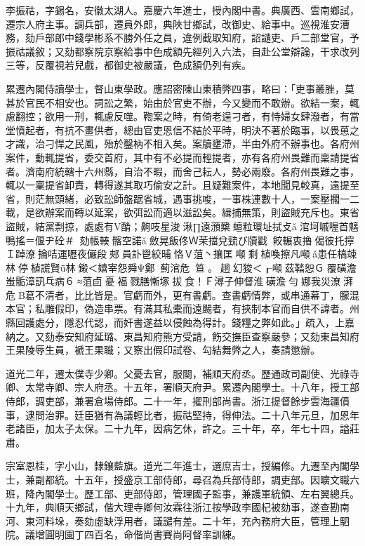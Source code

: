 \begin{pinyinscope}
李振祜，字錫名，安徽太湖人。嘉慶六年進士，授內閣中書。典廣西、雲南鄉試，遷宗人府主事。調兵部，遷員外郎，典陜甘鄉試，改御史、給事中。巡視淮安漕務，劾戶部郎中錢學彬系不勝外任之員，違例截取知府，詔譴吏、戶二部堂官，予振祜議敘；又劾都察院京察給事中色成額先經列入六法，自赴公堂辯論，干求改列三等，反覆視若兒戲，都御史被嚴議，色成額仍列有疾。

累遷內閣侍讀學士，督山東學政。應詔密陳山東積弊四事，略曰：「吏事叢脞，莫甚於官民不相安也。詞訟之繁，始由於官吏不辦，今又變而不敢辦。欲結一案，輒慮翻控；欲用一刑，輒慮反噬。鞫案之時，有倚老逞刁者，有恃婦女肆潑者，有當堂憤起者，有抗不畫供者，總由官吏恩信不結於平時，明決不著於臨事，以畏葸之才識，治刁悍之民風，殆於鑿枘不相入矣。案牘壅滯，半由外府不辦事也。各府州案件，動輒提省，委交首府，其中有不必提而輕提者，亦有各府州畏難而稟請提省者。濟南府統轄十六州縣，自治不暇，而舍己耘人，勢必兩廢。各府州畏難之事，輒以一稟提省卸責，轉得遂其取巧偷安之計。且疑難案件，本地聞見較真，遠提至省，則茫無頭緒，必致訟師盤踞省城，遇事挑唆，一事株連數十人，一案壓擱一二載，是欲辦案而轉以延案，欲弭訟而適以滋訟矣。緝捕無策，則盜賊充斥也。東省盜賊，結黨剽掠，處處有V酳；齁吱星浚湫∏遠澦櫫蟺粒環址拭⽁ǎ涫坷嘁喔首魑鴨搖＝偃ヂ砼＃劾帳輳髂空諾ǎ斂晃飯佟Ｗ茉擋兌巰び牘戳餃輾衷擼偈彼托擰Ｉ踔潦掄咭運嚦夜儼段郟員訃鬯絞晡恪Ｖ菹⼂攘匡噸剩植喚擦凡噸ǎ患任槁竦林停植謊賢ǖ林鎩＜嬉宰怨舜Ψ鄭薊涫危笪。趟幻狻＜┎噸茲鞜恕Ｇ覆磺澹蚩骺漳訊乓病６≈菹卣憂福戮膳慚塚拔食！Ｆ潯子伸督淮磺澹勻娜我災潦湃危B葛不清者，比比皆是。官虧而外，更有書虧。查書虧情弊，或串通幕丁，朦混本官；私雕假印，偽造串票。有滿其私橐而遠颺者，有挾制本官而自供不諱者。州縣回護處分，隱忍代認，而奸書遂益以侵蝕為得計。錢糧之弊如此。」疏入，上嘉納之。又劾泰安知府延璐、東昌知府熊方受請，飭交撫臣查察嚴參；又劾東昌知府王果陵辱生員，褫王果職；又察出假印試卷、勾結舞弊之人，奏請懲辦。

道光二年，遷太僕寺少卿。父憂去官，服闋，補順天府丞。歷通政司副使、光祿寺卿、太常寺卿、宗人府丞。十五年，署順天府尹。累遷內閣學士。十八年，授工部侍郎，調吏部，兼署倉場侍郎。二十一年，擢刑部尚書。浙江提督餘步雲海疆僨事，逮問治罪。廷臣猶有為議輕比者，振祜堅持，得伸法。二十八年元旦，加恩年老諸臣，加太子太保。二十九年，因病乞休，許之。三十年，卒，年七十四，謚莊肅。

宗室恩桂，字小山，隸鑲藍旗。道光二年進士，選庶吉士，授編修。九遷至內閣學士，兼副都統。十五年，授盛京工部侍郎，尋召為兵部侍郎，調吏部。因曠文職六班，降內閣學士。歷工部、吏部侍郎，管理國子監事，兼護軍統領、左右翼總兵。十九年，典順天鄉試，偕大理寺卿何汝霖往浙江按學政李國杞被劾事，遂查勘南河、東河料垛，奏劾虛缺浮用者，議譴有差。二十年，充內務府大臣，管理上駟院。議增圓明園丁四百名，命偕尚書賽尚阿督率訓練。


\end{pinyinscope}
